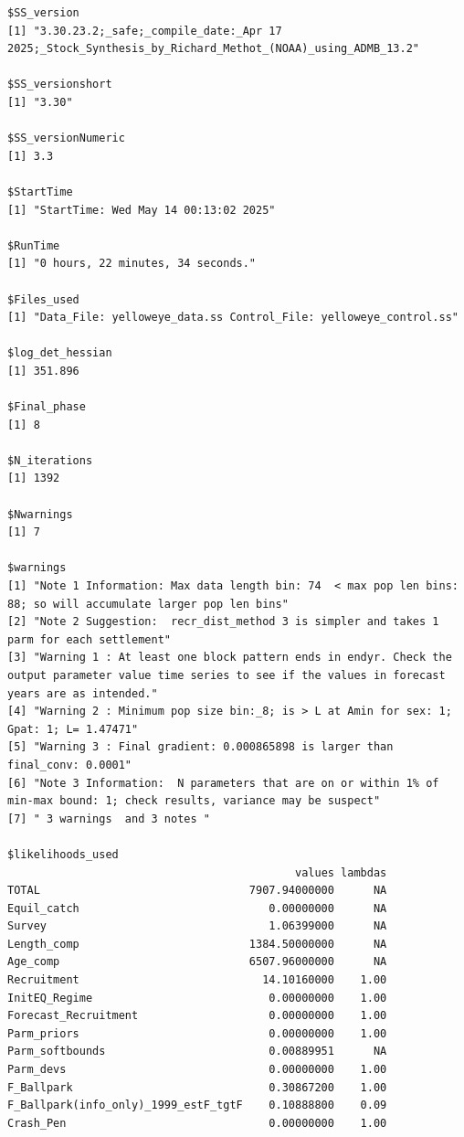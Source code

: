 \documentclass[
]{scrartcl}
\begin{document}
\newpage{}

\begin{verbatim}
$SS_version
[1] "3.30.23.2;_safe;_compile_date:_Apr 17 2025;_Stock_Synthesis_by_Richard_Methot_(NOAA)_using_ADMB_13.2"

$SS_versionshort
[1] "3.30"

$SS_versionNumeric
[1] 3.3

$StartTime
[1] "StartTime: Wed May 14 00:13:02 2025"

$RunTime
[1] "0 hours, 22 minutes, 34 seconds."

$Files_used
[1] "Data_File: yelloweye_data.ss Control_File: yelloweye_control.ss"

$log_det_hessian
[1] 351.896

$Final_phase
[1] 8

$N_iterations
[1] 1392

$Nwarnings
[1] 7

$warnings
[1] "Note 1 Information: Max data length bin: 74  < max pop len bins: 88; so will accumulate larger pop len bins"                                               
[2] "Note 2 Suggestion:  recr_dist_method 3 is simpler and takes 1 parm for each settlement"                                                                    
[3] "Warning 1 : At least one block pattern ends in endyr. Check the output parameter value time series to see if the values in forecast years are as intended."
[4] "Warning 2 : Minimum pop size bin:_8; is > L at Amin for sex: 1; Gpat: 1; L= 1.47471"                                                                       
[5] "Warning 3 : Final gradient: 0.000865898 is larger than final_conv: 0.0001"                                                                                 
[6] "Note 3 Information:  N parameters that are on or within 1% of min-max bound: 1; check results, variance may be suspect"                                    
[7] " 3 warnings  and 3 notes "                                                                                                                                 

$likelihoods_used
                                            values lambdas
TOTAL                                7907.94000000      NA
Equil_catch                             0.00000000      NA
Survey                                  1.06399000      NA
Length_comp                          1384.50000000      NA
Age_comp                             6507.96000000      NA
Recruitment                            14.10160000    1.00
InitEQ_Regime                           0.00000000    1.00
Forecast_Recruitment                    0.00000000    1.00
Parm_priors                             0.00000000    1.00
Parm_softbounds                         0.00889951      NA
Parm_devs                               0.00000000    1.00
F_Ballpark                              0.30867200    1.00
F_Ballpark(info_only)_1999_estF_tgtF    0.10888800    0.09
Crash_Pen                               0.00000000    1.00


\end{verbatim}
\end{document}

